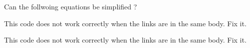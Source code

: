 
\begin{DoxyRefList}
\item[\label{todo__todo000003}%
\hypertarget{todo__todo000003}{}%
Member \hyperlink{classOpenHRP_1_1CFSImpl_a3032163447ca65ec81dc2a5c29cecf34}{Open\-H\-R\-P\-:\-:C\-F\-S\-Impl\-:\-:extract\-Rel\-Accels\-From\-Link\-Pair\-Case1} (matrix\-\_\-range$<$ rmdmatrix $>$ \&Kxn, matrix\-\_\-range$<$ rmdmatrix $>$ \&Kxt, Link\-Pair \&link\-Pair, int test\-Force\-Index, int constraint\-Index)]Can the follwoing equations be simplified ?  
\item[\label{todo__todo000001}%
\hypertarget{todo__todo000001}{}%
Member \hyperlink{classOpenHRP_1_1CFSImpl_aa85768ddd80a84f7ab6f038ef21e1869}{Open\-H\-R\-P\-:\-:C\-F\-S\-Impl\-:\-:set\-Acceleration\-Matrix} ()]This code does not work correctly when the links are in the same body. Fix it. 

This code does not work correctly when the links are in the same body. Fix it. 
\end{DoxyRefList}